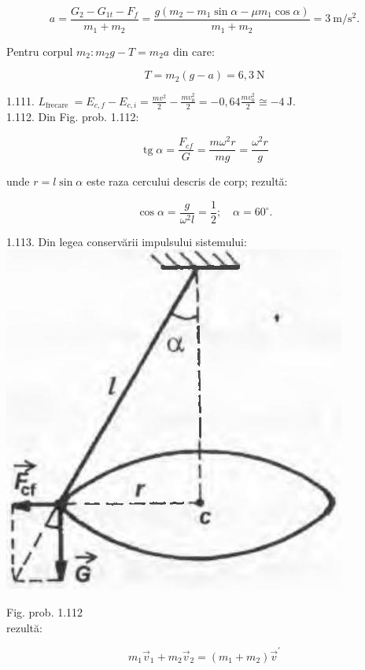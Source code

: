 \documentclass[10pt]{article}
\begin{document}
$$
a=\frac{G_{2}-G_{1 t}-F_{f}}{m_{1}+m_{2}}=\frac{g\left(m_{2}-m_{1} \sin \alpha-\mu m_{1} \cos \alpha\right)}{m_{1}+m_{2}}=3 \mathrm{~m} / \mathrm{s}^{2} .
$$

Pentru corpul $m_{2}: m_{2} g-T=m_{2} a$ din care:

$$
T=m_{2}(g-a)=6,3 \mathrm{~N}
$$

1.111. $L_{\text {frecare }}=E_{c, f}-E_{c, i}=\frac{m v^{2}}{2}-\frac{m v_{0}^{2}}{2}=-0,64 \frac{m v_{0}^{2}}{2} \cong-4 \mathrm{~J}$.\\
1.112. Din Fig. prob. 1.112:

$$
\operatorname{tg} \alpha=\frac{F_{c f}}{G}=\frac{m \omega^{2} r}{m g}=\frac{\omega^{2} r}{g}
$$

unde $r=l \sin \alpha$ este raza cercului descris de corp; rezultă:

$$
\cos \alpha=\frac{g}{\omega^{2} l}=\frac{1}{2} ; \quad \alpha=60^{\circ} .
$$

1.113. Din legea conservării impulsului sistemului:\\
\includegraphics[max width=\textwidth, center]{2025_07_01_5b3ff9fa0d508c8e9f17g-221}

Fig. prob. 1.112\\
rezultă:

$$
m_{1} \vec{v}_{1}+m_{2} \vec{v}_{2}=\left(m_{1}+m_{2}\right) \vec{v}^{\prime}
$$
\end{document}
